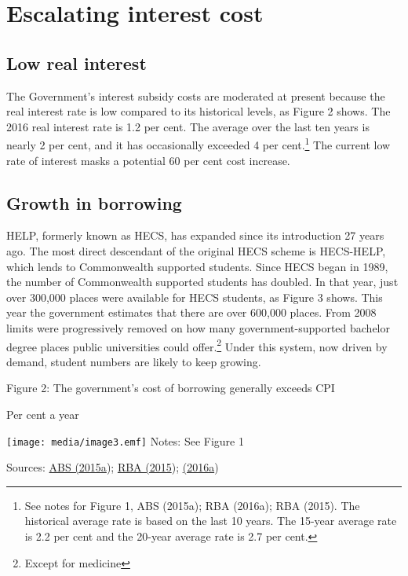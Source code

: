 \documentclass[]{book}
\begin{document}
\section{Escalating interest cost}\label{escalating-interest-cost}

\subsection{Low real interest}\label{low-real-interest}

The Government's interest subsidy costs are moderated at present because the real interest rate is low compared to its historical levels, as Figure 2 shows. The 2016 real interest rate is 1.2 per cent. The average over the last ten years is nearly 2 per cent, and it has occasionally exceeded 4 per cent.\footnote{See notes for Figure 1, ABS (2015a); RBA (2016a); RBA (2015). The historical average rate is based on the last 10 years. The 15-year average rate is 2.2 per cent and the 20-year average rate is 2.7 per cent.} The current low rate of interest masks a potential 60 per cent cost increase.

\subsection{Growth in borrowing}\label{growth-in-borrowing}

HELP, formerly known as HECS, has expanded since its introduction 27 years ago. The most direct descendant of the original HECS scheme is HECS-HELP, which lends to Commonwealth supported students. Since HECS began in 1989, the number of Commonwealth supported students has doubled. In that year, just over 300,000 places were available for HECS students, as Figure 3 shows. This year the government estimates that there are over 600,000 places. From 2008 limits were progressively removed on how many government-supported bachelor degree places public universities could offer.\footnote{Except for medicine} Under this system, now driven by demand, student numbers are likely to keep growing.

\protect\hypertarget{_Ref332980126}{}{}Figure 2: The government's cost of borrowing generally exceeds CPI

Per cent a year

\texttt{[image: media/image3.emf]} Notes: See Figure 1

Sources: \protect\hyperlink{_ENREF_2}{ABS (2015a}); \protect\hyperlink{_ENREF_67}{RBA (2015}); \protect\hyperlink{_ENREF_68}{(2016a})
\end{document}
